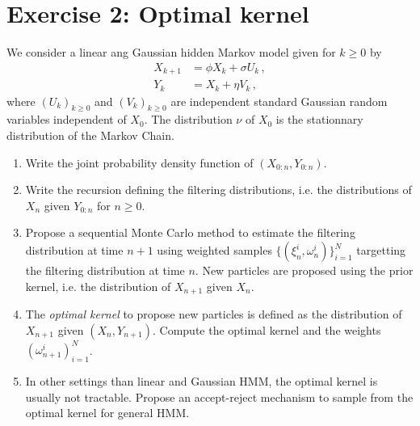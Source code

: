 \documentclass[a4paper,10pt,fleqn]{article}
\newcommand{\1}{\ensuremath{\mathbbm{1}}}
\begin{document}
\section*{Exercise 2: Optimal kernel}
We consider a linear ang Gaussian hidden Markov model given for $k\geq 0$ by
\begin{align*}
X_{k+1} &= \phi X_k + \sigma U_k\,,\\
Y_k &= X_k + \eta V_k\,,
\end{align*}
where $(U_k)_{k\geq 0}$ and $(V_k)_{k\geq 0}$ are independent standard Gaussian random variables independent of $X_0$. The distribution $\nu$ of $X_0$ is the stationnary distribution of the Markov Chain. 
\begin{enumerate}
\item Write the joint probability density function of $(X_{0:n},Y_{0:n})$.
\item Write the recursion defining the filtering distributions, i.e. the distributions of  $X_{n}$ given $Y_{0:n}$ for $n\geq 0$.
\item Propose a sequential Monte Carlo method to estimate the filtering distribution at time $n+1$ using weighted samples $\{(\xi_n^i,\omega_n^i)\}_{i=1}^N$ targetting the filtering distribution at time $n$. New particles are proposed using the prior kernel, i.e. the distribution of $X_{n+1}$ given $X_n$.	
\item The {\em optimal kernel} to propose new particles is defined as the distribution of $X_{n+1}$ given $(X_n,Y_{n+1})$. Compute the optimal kernel and the weights $(\omega_{n+1}^i)_{i=1}^N$.
\item In other settings than linear and Gaussian HMM, the optimal kernel is usually not tractable. Propose an accept-reject mechanism to sample from the optimal kernel for general HMM.
\end{enumerate}
\end{document}
